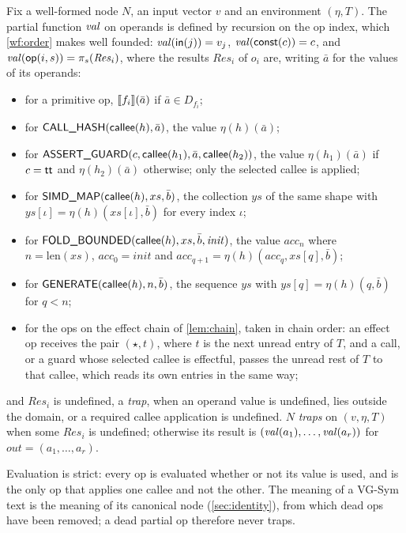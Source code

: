 \begin{definition}[Evaluation]\label{def:eval}
Fix a well-formed node $N$, an input vector $v$ and an environment $(\eta,T)$. The partial
function $\mathit{val}$ on operands is defined by recursion on the op index, which \ref{wf:order}
makes well founded: $\mathit{val}(\mathsf{in}(j))=v_j$, $\mathit{val}(\mathsf{const}(c))=c$, and
$\mathit{val}(\mathsf{op}(i,s))=\pi_s(\mathit{Res}_i)$, where the results $\mathit{Res}_i$ of $o_i$
are, writing $\bar a$ for the values of its operands:
\begin{itemize}
\item for a primitive op, $\llbracket f_i \rrbracket(\bar a)$ if $\bar a\in D_{f_i}$;
\item for $\mbox{\textsf{CALL\_HASH}}(\mathsf{callee}(h),\bar a)$, the value $\eta(h)(\bar a)$;
\item for $\mbox{\textsf{ASSERT\_GUARD}}(c,\mathsf{callee}(h_1),\bar a,\mathsf{callee}(h_2))$, the value
  $\eta(h_1)(\bar a)$ if $c=\mathsf{tt}$ and $\eta(h_2)(\bar a)$ otherwise; only the selected callee
  is applied;
\item for $\mbox{\textsf{SIMD\_MAP}}(\mathsf{callee}(h),xs,\bar b)$, the collection $ys$ of the same shape
  with $ys[\iota]=\eta(h)(xs[\iota],\bar b)$ for every index $\iota$;
\item for $\mbox{\textsf{FOLD\_BOUNDED}}(\mathsf{callee}(h),xs,\bar b,\mathit{init})$, the value
  $\mathit{acc}_n$ where $n=\mathrm{len}(xs)$, $\mathit{acc}_0=\mathit{init}$ and
  $\mathit{acc}_{q+1}=\eta(h)(\mathit{acc}_q,xs[q],\bar b)$;
\item for $\mbox{\textsf{GENERATE}}(\mathsf{callee}(h),n,\bar b)$, the sequence $ys$ with
  $ys[q]=\eta(h)(q,\bar b)$ for $q<n$;
\item for the ops on the effect chain of \cref{lem:chain}, taken in chain order: an effect op
  receives the pair $(\star,t)$, where $t$ is the next unread entry of $T$, and a call, or a
  guard whose selected callee is effectful, passes the unread rest of $T$ to that callee, which
  reads its own entries in the same way;
\end{itemize}
and $\mathit{Res}_i$ is undefined, a \emph{trap}, when an operand value is undefined, lies
outside the domain, or a required callee application is undefined. $N$ \emph{traps} on
$(v,\eta,T)$ when some $\mathit{Res}_i$ is undefined; otherwise its result is
$(\mathit{val}(a_1),\dots,\mathit{val}(a_r))$ for $\mathit{out}=(a_1,\dots,a_r)$.
\end{definition}

Evaluation is strict: every op is evaluated whether or not its value is used, and
 is the only op that applies one callee and not the other. The meaning of a
VG-Sym text is the meaning of its canonical node (\cref{sec:identity}), from which dead ops have
been removed; a dead partial op therefore never traps.

